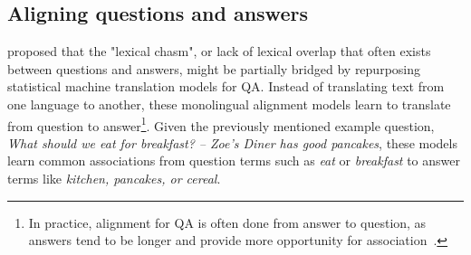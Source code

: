 



\subsection{Aligning questions and answers}
\label{sec:intro_naacl2015}
\citet{Berger:00} proposed that the "lexical chasm", or lack of lexical overlap that often exists between questions and answers, might be partially bridged by repurposing statistical machine translation models for QA. Instead of translating text from one language to another, these monolingual alignment models learn to translate from question to answer\footnote{In practice, alignment for QA is often done from answer to question, as answers tend to be longer and provide more opportunity for association~\citep{Surdeanu:11}.}.  Given the previously mentioned example question, {\em What should we eat for breakfast? -- Zoe's Diner has good pancakes}, these models learn common associations from question terms such as {\em eat} or {\em breakfast} to answer terms like {\em kitchen, pancakes, or cereal}.

